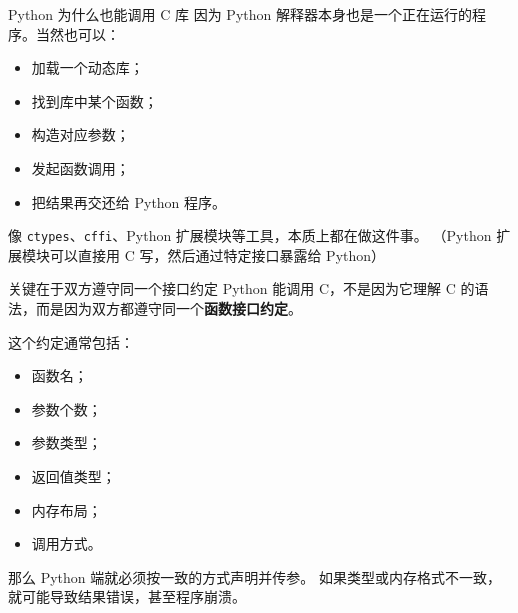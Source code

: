 \documentclass[aspectratio=169,11pt]{ctexbeamer}
\begin{document}
\begin{frame}{Python 为什么也能调用 C 库}
因为 Python 解释器本身也是一个正在运行的程序。当然也可以：

\begin{itemize}
  \item 加载一个动态库；
  \item 找到库中某个函数；
  \item 构造对应参数；
  \item 发起函数调用；
  \item 把结果再交还给 Python 程序。
\end{itemize}

\vspace{0.5em}
像 \texttt{ctypes}、\texttt{cffi}、Python 扩展模块等工具，本质上都在做这件事。
（Python 扩展模块可以直接用 C 写，然后通过特定接口暴露给 Python）
\end{frame}

\begin{frame}[fragile]{关键在于双方遵守同一个接口约定}
Python 能调用 C，不是因为它理解 C 的语法，而是因为双方都遵守同一个\textbf{函数接口约定}。

\vspace{0.5em}
这个约定通常包括：

\begin{itemize}
  \item 函数名；
  \item 参数个数；
  \item 参数类型；
  \item 返回值类型；
  \item 内存布局；
  \item 调用方式。
\end{itemize}

那么 Python 端就必须按一致的方式声明并传参。  
如果类型或内存格式不一致，就可能导致结果错误，甚至程序崩溃。

\end{frame}
\end{document}
